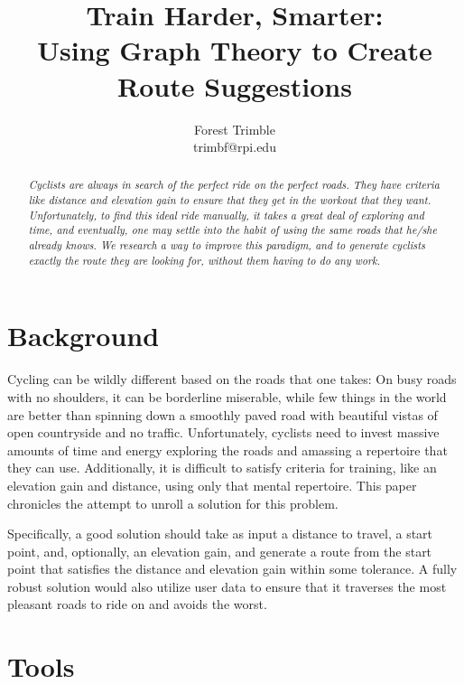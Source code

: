 \documentclass[twocolumn,12pt]{article}
\title{Train Harder, Smarter:\\Using Graph Theory to Create Route Suggestions}
\author{Forest Trimble\\trimbf@rpi.edu}
\begin{document}
\setlength{\headheight}{15pt}

\pagestyle{fancy}
\fancyhead{}
\maketitle

\newcommand{\mycite}[1]{[\citenum{#1}]}

\begin{abstract}
  \emph{Cyclists are always in search of the perfect ride on the perfect
  roads. They have criteria like distance and elevation gain to ensure
  that they get in the workout that they want. Unfortunately, to
  find this ideal ride manually, it takes a great deal of exploring and
  time, and eventually, one may settle into the habit of using the same
  roads that he/she already knows. We research a way to improve this
  paradigm, and to generate cyclists exactly the route they are looking
  for, without them having to do any work.}
\end{abstract}

\section{Background} \label{sec:back}

Cycling can be wildly different based on the roads that one takes: On busy
roads with no shoulders, it can be borderline miserable, while few things in
the world are better than spinning down a smoothly paved road with beautiful
vistas of open countryside and no traffic. Unfortunately, cyclists need to
invest massive amounts of time and energy exploring the roads and amassing a
repertoire that they can use. Additionally, it is difficult to satisfy criteria
for training, like an elevation gain and distance, using only that mental
repertoire. This paper chronicles the attempt to unroll a solution for this
problem.

Specifically, a good solution should take as input a distance to travel, a
start point, and, optionally, an elevation gain, and generate a route from the
start point that satisfies the distance and elevation gain within some
tolerance. A fully robust solution would also utilize user data to ensure that
it traverses the most pleasant roads to ride on and avoids the worst.

\section{Tools}
\end{document}
